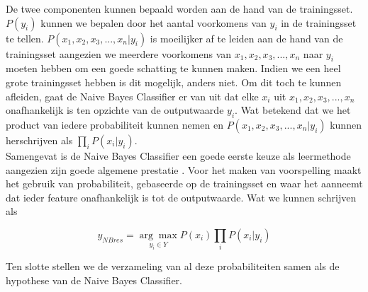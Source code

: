 De twee componenten kunnen bepaald worden aan de hand van de trainingsset. $P(y_i)$ kunnen we bepalen door het aantal voorkomens van $y_i$ in de trainingsset te tellen. $P(x_{1},x_{2},x_{3},...,x_{n}|y_i)$ is moeilijker af te leiden aan de hand van de trainingsset aangezien we meerdere voorkomens van $x_{1},x_{2},x_{3},...,x_{n}$ naar $y_i$ moeten hebben om een goede schatting te kunnen maken.  Indien we een heel grote trainingsset hebben is dit mogelijk, anders niet. Om dit toch te kunnen afleiden, gaat de Naive Bayes Classifier er van uit dat elke $x_i$ uit $x_{1},x_{2},x_{3},...,x_{n}$ onafhankelijk is ten opzichte van de outputwaarde $y_i$. Wat betekend dat we het product van iedere probabiliteit kunnen nemen en $P(x_{1},x_{2},x_{3},...,x_{n}|y_i)$  kunnen herschrijven als $\prod\limits_{i} P(x_{i}|y_{i})$.\\
%
Samengevat is de Naive Bayes Classifier een goede eerste keuze als leermethode aangezien zijn goede algemene prestatie \cite{Michie94machinelearning}. Voor het maken van voorspelling maakt het gebruik van probabiliteit, gebaseerde op de trainingsset en waar het aanneemt dat ieder feature onafhankelijk is tot de outputwaarde. Wat we kunnen schrijven als

 \[y_{NBres} = \underset{y_i \in Y}{\arg\max} P(x_{i})\prod\limits_{i} P(x_{i}|y_{i}) \]

Ten slotte stellen we de verzameling van al deze probabiliteiten samen als de hypothese van de Naive Bayes Classifier.

